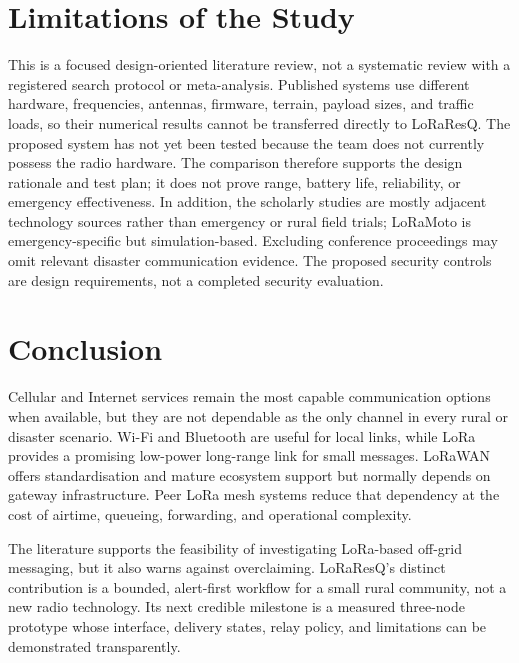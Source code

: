 \documentclass[journal]{IEEEtran}
\begin{document}
\section{Limitations of the Study}
This is a focused design-oriented literature review, not a systematic review
with a registered search protocol or meta-analysis. Published systems use
different hardware, frequencies, antennas, firmware, terrain, payload sizes,
and traffic loads, so their numerical results cannot be transferred directly
to LoRaResQ. The proposed system has not yet been tested because the team does
not currently possess the radio hardware. The comparison therefore supports
the design rationale and test plan; it does not prove range, battery life,
reliability, or emergency effectiveness. In addition, the scholarly studies
are mostly adjacent technology sources rather than emergency or rural field
trials; LoRaMoto is emergency-specific but simulation-based. Excluding
conference proceedings may omit relevant disaster communication evidence. The
proposed security controls are design
requirements, not a completed security evaluation.

\section{Conclusion}
Cellular and Internet services remain the most capable communication options
when available, but they are not dependable as the only channel in every
rural or disaster scenario. Wi-Fi and Bluetooth are useful for local links,
while LoRa provides a promising low-power long-range link for small messages.
LoRaWAN offers standardisation and mature ecosystem support but normally
depends on gateway infrastructure. Peer LoRa mesh systems reduce that
dependency at the cost of airtime, queueing, forwarding, and operational
complexity.

The literature supports the feasibility of investigating LoRa-based
off-grid messaging, but it also warns against overclaiming. LoRaResQ's
distinct contribution is a bounded, alert-first workflow for a small rural
community, not a new radio technology. Its next credible milestone is a
measured three-node prototype whose interface, delivery states, relay policy,
and limitations can be demonstrated transparently.
\end{document}
